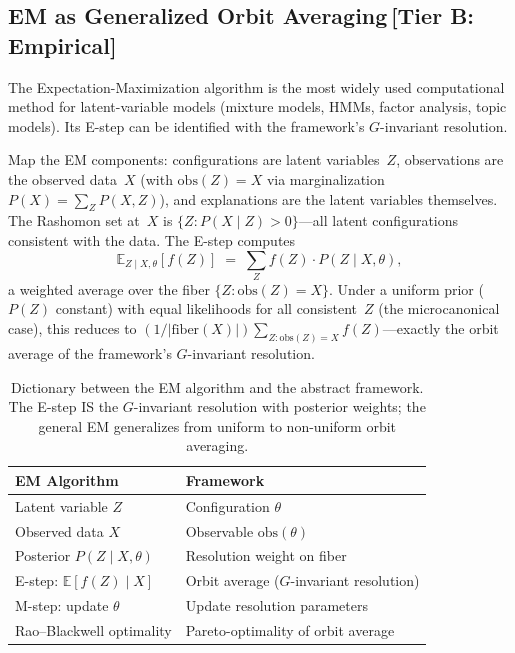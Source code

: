 \documentclass[11pt,a4paper]{article}
\newcommand{\E}{\mathbb{E}}
\begin{document}
\subsection{EM as Generalized Orbit Averaging\,\textnormal{\normalsize[Tier B: Empirical]}}
\label{sec:bridge-em}

The Expectation-Maximization algorithm \citep{dempster1977maximum} is the most
widely used computational method for latent-variable models (mixture models,
HMMs, factor analysis, topic models).  Its E-step can be identified with the
framework's $G$-invariant resolution.

Map the EM components: configurations are latent variables~$Z$, observations
are the observed data~$X$ (with $\mathrm{obs}(Z) = X$ via marginalization
$P(X) = \sum_Z P(X,Z)$), and explanations are the latent variables
themselves.  The Rashomon set at~$X$ is $\{Z : P(X \mid Z) > 0\}$---all
latent configurations consistent with the data.  The E-step computes
\[
  \E_{Z \mid X, \theta}[f(Z)]
  \;=\; \sum_Z f(Z) \cdot P(Z \mid X, \theta),
\]
a weighted average over the fiber $\{Z : \mathrm{obs}(Z) = X\}$.  Under a
uniform prior ($P(Z)$ constant) with equal likelihoods for all consistent~$Z$
(the microcanonical case), this reduces to $(1/|\mathrm{fiber}(X)|) \sum_{Z :
\mathrm{obs}(Z) = X} f(Z)$---exactly the orbit average of the framework's
$G$-invariant resolution.

\begin{table}[t]
  \centering
  \small
  \begin{tabular}{@{}ll@{}}
    \toprule
    \textbf{EM Algorithm} & \textbf{Framework} \\
    \midrule
    Latent variable $Z$ & Configuration $\theta$ \\
    Observed data $X$ & Observable $\mathrm{obs}(\theta)$ \\
    Posterior $P(Z \mid X, \theta)$ & Resolution weight on fiber \\
    E-step: $\E[f(Z) \mid X]$ & Orbit average ($G$-invariant resolution) \\
    M-step: update $\theta$ & Update resolution parameters \\
    Rao--Blackwell optimality & Pareto-optimality of orbit average \\
    \bottomrule
  \end{tabular}
  \caption{Dictionary between the EM algorithm and the abstract framework.  The
    E-step IS the $G$-invariant resolution with posterior weights; the general
    EM generalizes from uniform to non-uniform orbit averaging.}
  \label{tab:em-dictionary}
\end{table}
\end{document}
